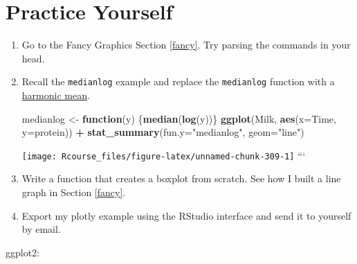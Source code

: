 \documentclass[]{book}
\newenvironment{Shaded}{\begin{snugshade}}{\end{snugshade}}
\newcommand{\KeywordTok}[1]{\textcolor[rgb]{0.13,0.29,0.53}{\textbf{#1}}}
\newcommand{\DataTypeTok}[1]{\textcolor[rgb]{0.13,0.29,0.53}{#1}}
\newcommand{\StringTok}[1]{\textcolor[rgb]{0.31,0.60,0.02}{#1}}
\newcommand{\ControlFlowTok}[1]{\textcolor[rgb]{0.13,0.29,0.53}{\textbf{#1}}}
\newcommand{\OperatorTok}[1]{\textcolor[rgb]{0.81,0.36,0.00}{\textbf{#1}}}
\newcommand{\NormalTok}[1]{#1}
\theoremstyle{definition}
\theoremstyle{definition}
\theoremstyle{definition}
\theoremstyle{remark}
\begin{document}
\section{Practice Yourself}\label{practice-yourself-8}

\begin{enumerate}
\def\labelenumi{\arabic{enumi}.}
\item
  Go to the Fancy Graphics Section \ref{fancy}. Try parsing the commands
  in your head.
\item
  Recall the \texttt{medianlog} example and replace the
  \texttt{medianlog} function with a
  \href{https://en.wikipedia.org/wiki/Harmonic_mean}{harmonic mean}.

\begin{Shaded}
\begin{Highlighting}[]
\NormalTok{medianlog <-}\StringTok{ }\ControlFlowTok{function}\NormalTok{(y) \{}\KeywordTok{median}\NormalTok{(}\KeywordTok{log}\NormalTok{(y))\}}
\KeywordTok{ggplot}\NormalTok{(Milk, }\KeywordTok{aes}\NormalTok{(}\DataTypeTok{x=}\NormalTok{Time, }\DataTypeTok{y=}\NormalTok{protein)) }\OperatorTok{+}
\StringTok{  }\KeywordTok{stat_summary}\NormalTok{(}\DataTypeTok{fun.y=}\StringTok{"medianlog"}\NormalTok{, }\DataTypeTok{geom=}\StringTok{"line"}\NormalTok{)}
\end{Highlighting}
\end{Shaded}

  \texttt{[image: Rcourse\_files/figure-latex/unnamed-chunk-309-1]}
  ```
\item
  Write a function that creates a boxplot from scratch. See how I built
  a line graph in Section \ref{fancy}.
\item
  Export my plotly example using the RStudio interface and send it to
  yourself by email.
\end{enumerate}

ggplot2:
\end{document}
